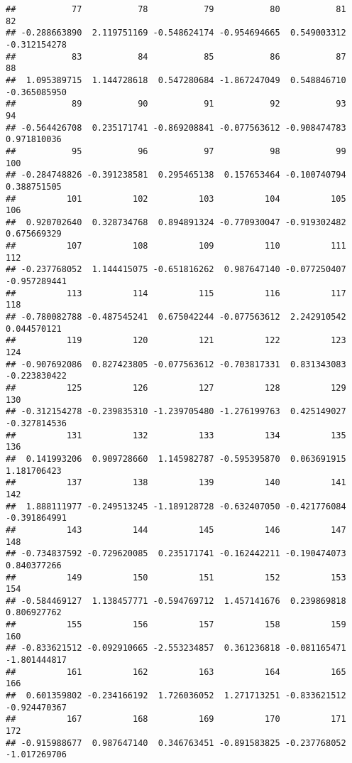 \documentclass[
]{article}
\begin{document}
\begin{verbatim}
##           77           78           79           80           81           82 
## -0.288663890  2.119751169 -0.548624174 -0.954694665  0.549003312 -0.312154278 
##           83           84           85           86           87           88 
##  1.095389715  1.144728618  0.547280684 -1.867247049  0.548846710 -0.365085950 
##           89           90           91           92           93           94 
## -0.564426708  0.235171741 -0.869208841 -0.077563612 -0.908474783  0.971810036 
##           95           96           97           98           99          100 
## -0.284748826 -0.391238581  0.295465138  0.157653464 -0.100740794  0.388751505 
##          101          102          103          104          105          106 
##  0.920702640  0.328734768  0.894891324 -0.770930047 -0.919302482  0.675669329 
##          107          108          109          110          111          112 
## -0.237768052  1.144415075 -0.651816262  0.987647140 -0.077250407 -0.957289441 
##          113          114          115          116          117          118 
## -0.780082788 -0.487545241  0.675042244 -0.077563612  2.242910542  0.044570121 
##          119          120          121          122          123          124 
## -0.907692086  0.827423805 -0.077563612 -0.703817331  0.831343083 -0.223830422 
##          125          126          127          128          129          130 
## -0.312154278 -0.239835310 -1.239705480 -1.276199763  0.425149027 -0.327814536 
##          131          132          133          134          135          136 
##  0.141993206  0.909728660  1.145982787 -0.595395870  0.063691915  1.181706423 
##          137          138          139          140          141          142 
##  1.888111977 -0.249513245 -1.189128728 -0.632407050 -0.421776084 -0.391864991 
##          143          144          145          146          147          148 
## -0.734837592 -0.729620085  0.235171741 -0.162442211 -0.190474073  0.840377266 
##          149          150          151          152          153          154 
## -0.584469127  1.138457771 -0.594769712  1.457141676  0.239869818  0.806927762 
##          155          156          157          158          159          160 
## -0.833621512 -0.092910665 -2.553234857  0.361236818 -0.081165471 -1.801444817 
##          161          162          163          164          165          166 
##  0.601359802 -0.234166192  1.726036052  1.271713251 -0.833621512 -0.924470367 
##          167          168          169          170          171          172 
## -0.915988677  0.987647140  0.346763451 -0.891583825 -0.237768052 -1.017269706 

\end{verbatim}
\end{document}
